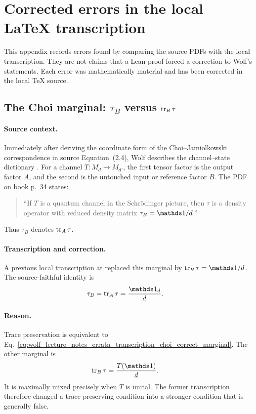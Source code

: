 \documentclass{article}
\begin{document}
\appendix
\section{Corrected errors in the local LaTeX transcription}
\label{app:transcription}

This appendix records errors found by comparing the source PDFs with the local
transcription. They are not claims that a Lean proof forced a correction to
Wolf's statements. Each error was mathematically material and has been
corrected in the local TeX source.

\subsection{The Choi marginal: $\tau_B$ versus $\operatorname{tr}_B\tau$}

\paragraph{Source context.}
Immediately after deriving the coordinate form of the Choi--Jamiolkowski
correspondence in source Equation~(2.4), Wolf describes the channel--state
dictionary \cite[Equation~(2.4)]{Wolf2012Quantum}. For a channel
$T:M_d\to M_{d'}$, the first tensor factor is the output factor $A$, and the
second is the untouched input or reference factor $B$. The PDF on book p.~34
states:
\begin{quote}
``If $T$ is a quantum channel in the Schr\"odinger picture, then $\tau$ is a
density operator with reduced density matrix $\tau_B=\one/d$.''
\end{quote}
Thus $\tau_B$ denotes $\operatorname{tr}_A\tau$.

\paragraph{Transcription and correction.}
A previous local transcription at
 replaced this marginal by
$\tr_B\tau=\one/d$. The source-faithful identity is
\begin{align}
    \tau_B
        =\tr_A\tau
        &=\frac{\one_d}{d}.
    \label{eq:wolf_lecture_notes_errata_transcription_choi_correct_marginal}
\end{align}

\paragraph{Reason.}
Trace preservation is equivalent to
Eq.~\ref{eq:wolf_lecture_notes_errata_transcription_choi_correct_marginal}.
The other marginal is
\begin{align}
    \tr_B\tau
        &=\frac{T(\one)}{d}.
    \label{eq:wolf_lecture_notes_errata_transcription_choi_other_marginal}
\end{align}
It is maximally mixed precisely when $T$ is unital. The former transcription
therefore changed a trace-preserving condition into a stronger condition that
is generally false.
\end{document}
